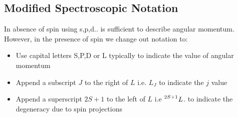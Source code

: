 \subsection{Modified Spectroscopic Notation}
In absence of spin using s,p,d.. is sufficient to describe angular momentum. However, in the presence of spin we change out notation to:
\begin{itemize}
\item Use capital letters S,P,D or L typically to indicate the value of angular momentum
\item Append a subscript $J$ to the right of $L$ i.e. $L_{J}$ to indicate the $j$ value
\item Append a superscript $2S+1$ to the left of $L$ i.e $\prescript{2S+1}{}L$. to indicate the degeneracy due to spin projections
\end{itemize}
